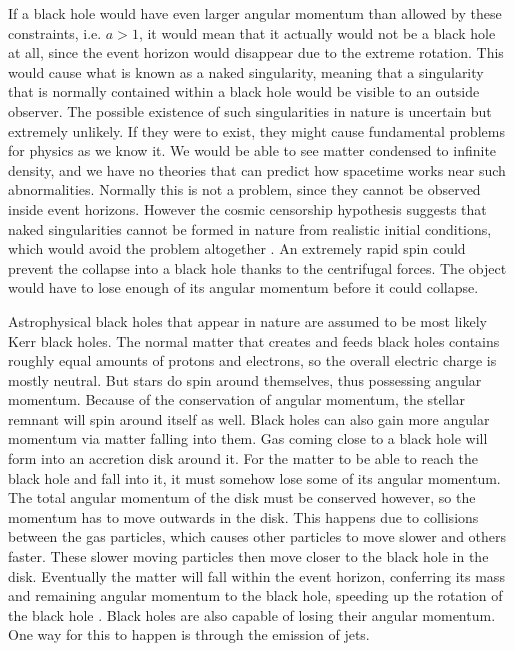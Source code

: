 \documentclass[english, oneside]{HYgradu}
\begin{document}
If a black hole would have even larger angular momentum than allowed by these constraints, i.e. $a > 1$, it would mean that it actually would not be a black hole at all, since the event horizon would disappear due to the extreme rotation. 
This would cause what is known as a naked singularity, meaning that a singularity that is normally contained within a black hole would be visible to an outside observer. The possible existence of such singularities in nature is uncertain but extremely unlikely. If they were to exist, they might cause fundamental problems for physics as we know it. We would be able to see matter condensed to infinite density, and we have no theories that can predict how spacetime works near such abnormalities. Normally this is not a problem, since they cannot be observed inside event horizons. However the cosmic censorship hypothesis suggests that naked singularities cannot be formed in nature from realistic initial conditions, which would avoid the problem altogether \citep{wald:1997}. An extremely rapid spin could prevent the collapse into a black hole thanks to the centrifugal forces. The object would have to lose enough of its angular momentum before it could collapse.

Astrophysical black holes that appear in nature are assumed to be most likely Kerr black holes. The normal matter that creates and feeds black holes contains roughly equal amounts of protons and electrons, so the overall electric charge is mostly neutral. But stars do spin around themselves, thus possessing angular momentum. Because of the conservation of angular momentum, the stellar remnant will spin around itself as well. Black holes can also gain more angular momentum via matter falling into them. Gas coming close to a black hole will form into an accretion disk around it. For the matter to be able to reach the black hole and fall into it, it must somehow lose some of its angular momentum. The total angular momentum of the disk must be conserved however, so the momentum has to move outwards in the disk. This happens due to collisions between the gas particles, which causes other particles to move slower and others faster. These slower moving particles then move closer to the black hole in the disk. Eventually the matter will fall within the event horizon, conferring its mass and remaining angular momentum to the black hole, speeding up the rotation of the black hole \citep{bhphysics}. Black holes are also capable of losing their angular momentum. One way for this to happen is through the emission of jets.
\end{document}
